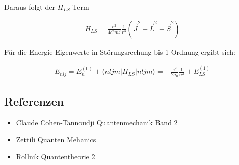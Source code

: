 Daraus folgt der \(H_{LS}\)-Term

\begin{align}
  \label{eq:11}
  H_{LS} =  \frac{e^2}{4  c^2 m_e^2}\frac{1}{r^3}(\vec J^2-\vec L^2-  \vec S^2)
\end{align}

Für die Energie-Eigenwerte in Störungsrechung bis 1-Ordnung ergibt sich:

\begin{align}
  \label{eq:12}
  E_{nlj} = E^{(0)}_n + \langle nljm|H_{LS}|nljm\rangle = -\frac{e^2}{2a_0}\frac{1}{n^2} + E_{LS}^{(1)}
\end{align}

\subsection*{Referenzen}


\begin{itemize}
\item Claude Cohen-Tannoudji Quantenmechanik Band 2
\item Zettili Quanten Mehanics
\item Rollnik Quantentheorie 2
\end{itemize}


